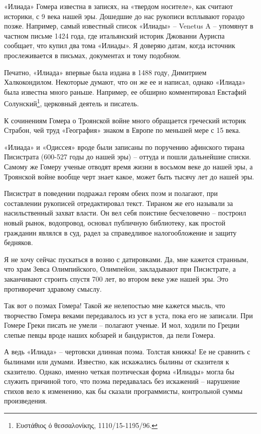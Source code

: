 «Илиада» Гомера известна в записях, на «твердом носителе», как считают историки, с 9 века нашей эры. Дошедшие до нас рукописи всплывают гораздо позже. Например, самый известный список «Илиады» – Venetus A – упомянут в частном письме 1424 года, где итальянский историк Джованни Ауриспа сообщает, что купил два тома «Илиады». Я доверяю датам, когда источник прослеживается в письмах, документах и тому подобном. 

Печатно, «Илиада» впервые была издана в 1488 году, Димитрием Халкокондилом. Некоторые думают, что он же ее и написал, однако «Илиада» была известна много раньше. Например, ее обширно комментировал Евстафий Солунский\footnote{Ευστάθιος ό θεσσαλονίκης, 1110/15-1195/96.}, церковный деятель и писатель. 

К сочинениям Гомера о Троянской войне много обращается греческий историк Страбон, чей труд «География» знаком в Европе по меньшей мере с 15 века.

«Илиада» и «Одиссея» вроде были записаны по поручению афинского тирана Писистрата (600-527 годы до нашей эры) – оттуда и пошли дальнейшие списки. Самому же Гомеру ученые отводят время жизни в восьмом веке до нашей эры, а Троянской войне вообще черт знает какое, может быть тысячу лет до нашей эры.

Писистрат в поведении подражал героям обеих поэм и полагают, при составлении рукописей отредактировал текст. Тираном же его называли за насильственный захват власти. Он вел себя поистине бесчеловечно – построил новый рынок, водопровод, основал публичную библиотеку, как простой гражданин являлся в суд, радел за справедливое налогообложение и защиту бедняков.

Я не хочу сейчас пускаться в возню с датировками. Да, мне кажется странным, что храм Зевса Олимпийского, Олимпейон, закладывают при Писистрате, а заканчивают строить спустя 700 лет, во втором веке уже нашей эры. Это противоречит здравому смыслу.

Так вот о поэмах Гомера! Такой же нелепостью мне кажется мысль, что творчество Гомера веками передавалось из уст в уста, пока его не записали. При Гомере Греки писать не умели – полагают ученые. И мол, ходили по Греции слепые певцы вроде наших кобзарей и бандуристов, да пели Гомера. 

А ведь «Илиада» – чертовски длинная поэма. Толстая книжка! Ее не сравнить с былинами или думами. Известно, как искажались былины от сказителя к сказителю. Однако, именно четкая поэтическая форма «Илиады» могла бы служить причиной того, что поэма передавалась без искажений – нарушение стихов вело к изменению, как бы сказали программисты, контрольной суммы произведения.

